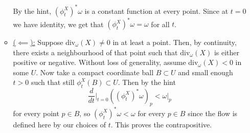 \documentclass[a4paper, 12pt]{article}
\begin{document}
\begin{Exercise}
\begin{enumerate}[label=(\roman*)]
\begin{itemize}
                    By the hint, $(\phi_t^X)^*\omega$ is a constant function at every point.
                    Since at $t = 0$ we have identity, we get that $(\phi_t^X)^* \omega = \omega$ for all $t$.
                \item \underline{($\impliedby$):}
                    Suppose $\text{div}_\omega(X) \neq 0$ in at least a point.
                    Then, by continuity, there exists a neighbourhood of that point such that $\text{div}_\omega(X)$ is either positive or negative.
                    Without loss of generality, assume $\text{div}_\omega(X) < 0$ in some $U$.
                    Now take a compact coordinate ball $B \subset U$ and small enough $t > 0$ such that still $\phi_t^X(B) \subset U$.
                    Then by the hint
                    \[
                        \frac{d}{dt}\Big|_{t = 0}\left( (\phi_t^X)^*\omega \right)_p < \omega|_p
                    \]
                    for every point $p \in B$, so $(\phi_t^X)^*\omega < \omega$ for every $p \in B$ since the flow is defined here by our choices of $t$.
                    This proves the contrapositive.
            \end{itemize}
    \end{enumerate}
\end{Exercise}
\end{document}
